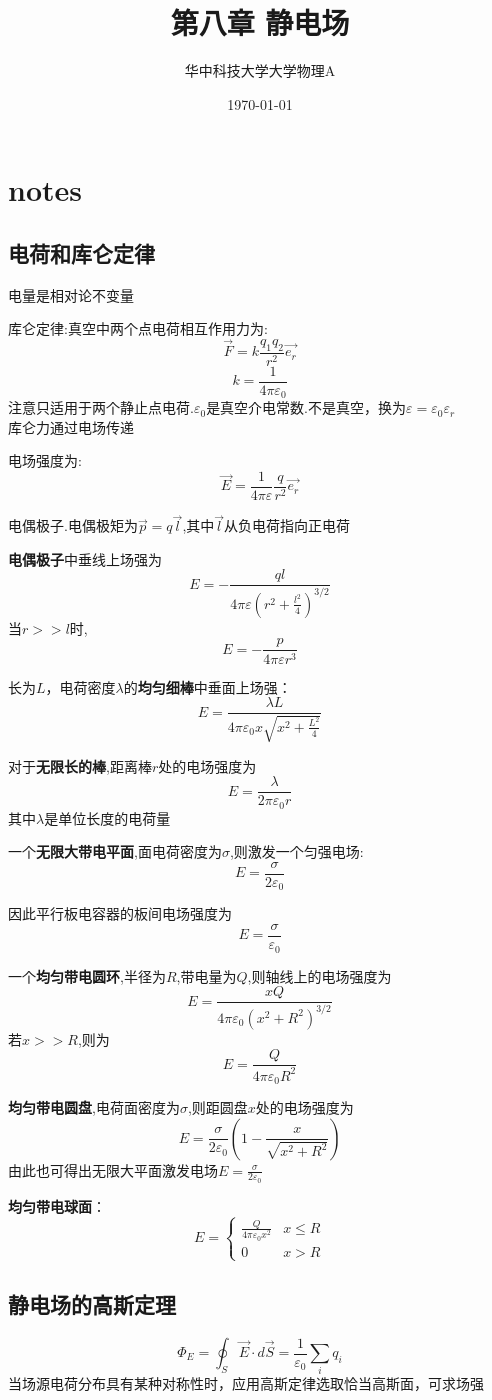 \documentclass[10pt,a4paper]{article}
\title{第八章 静电场}
\author{华中科技大学大学物理A}
\date{\today}
\begin{document}
\maketitle
\section{notes}
\subsection{电荷和库仑定律}
电量是相对论不变量

库仑定律:真空中两个点电荷相互作用力为:
\[\vec{F}=k\frac{q_1q_2}{r^2}\vec{e_r}\]
\[k=\frac{1}{4\pi\varepsilon_0}\]
注意只适用于两个静止点电荷.$\varepsilon_0$是真空介电常数.不是真空，换为$\varepsilon=\varepsilon_0\varepsilon_r$
\\库仑力通过电场传递

电场强度为:
\[\vec{E}=\frac{1}{4\pi\varepsilon}\frac{q}{r^2}\vec{e_r}\]

电偶极子.电偶极矩为$\vec{p}=q\vec{l}$,其中$\vec{l}$从负电荷指向正电荷

\textbf{电偶极子}中垂线上场强为\[E=-\frac{ql}{4\pi\varepsilon (r^2+\frac{l^2}{4})^{3/2}}\]
当$r>>l$时,
\[E=-\frac{p}{4\pi\varepsilon r^3}\]

长为$L$，电荷密度$\lambda$的\textbf{均匀细棒}中垂面上场强：
\[E=\frac{\lambda L}{4\pi\varepsilon_0 x\sqrt{x^2+\frac{L^2}{4}}}\]

对于\textbf{无限长的棒},距离棒$r$处的电场强度为
\[E=\frac{\lambda}{2\pi\varepsilon_0 r}\]其中$\lambda$是单位长度的电荷量

一个\textbf{无限大带电平面},面电荷密度为$\sigma$,则激发一个匀强电场:
\[E=\frac{\sigma}{2\varepsilon_0}\]

因此平行板电容器的板间电场强度为
\[E=\frac{\sigma}{\varepsilon_0}\]

一个\textbf{均匀带电圆环},半径为$R$,带电量为$Q$,则轴线上的电场强度为
\[E=\frac{xQ}{4\pi\varepsilon_0(x^2+R^2)^{3/2}}\]
若$x>>R$,则为\[E=\frac{Q}{4\pi\varepsilon_0R^2}\]

\textbf{均匀带电圆盘},电荷面密度为$\sigma$,则距圆盘$x$处的电场强度为\[E=\frac{\sigma}{2\varepsilon_0}(1-\frac{x}{\sqrt{x^2+R^2}})\]
由此也可得出无限大平面激发电场$E=\frac{\sigma}{2\varepsilon_0}$

\textbf{均匀带电球面}：
\[E=
\begin{cases}
\frac{Q}{4\pi\varepsilon_0x^2} & x\leq R\\
0 & x>R
\end{cases}
\]
\subsection{静电场的高斯定理}
\[\varPhi_E=\oint_S \vec E\cdot d\vec S=\frac{1}{\varepsilon_0}\sum_i q_i\]
当场源电荷分布具有某种对称性时，应用高斯定律选取恰当高斯面，可求场强
\end{document}
